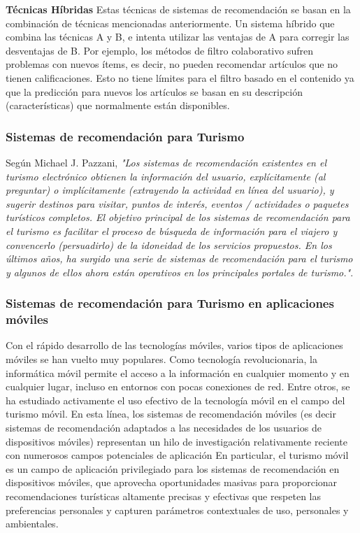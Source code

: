 \documentclass[12pt,letterpaper,openany]{book}
\begin{document}
\vspace{5mm}\newline
\textbf{Técnicas Híbridas}\newline
Estas técnicas de sistemas de recomendación se basan en la combinación de técnicas mencionadas anteriormente. Un sistema híbrido que combina las técnicas A y B, e intenta utilizar las ventajas de A para corregir las desventajas de B. Por ejemplo, los métodos de filtro colaborativo sufren problemas con nuevos ítems, es decir, no pueden recomendar artículos que no tienen calificaciones. Esto no tiene límites para el filtro basado en el contenido ya que la predicción para nuevos los artículos se basan en su descripción (características) que normalmente están disponibles\cite{13}. 

\subsubsection{Sistemas de recomendación para Turismo}
Según Michael J. Pazzani, \textit{"Los sistemas de recomendación existentes en el turismo electrónico obtienen la información del usuario, explícitamente (al preguntar) o implícitamente (extrayendo la actividad en línea del usuario), y sugerir destinos para visitar, puntos de interés, eventos / actividades o paquetes turísticos completos. El objetivo principal de los sistemas de recomendación para el turismo es facilitar el proceso de búsqueda de información para el viajero y convencerlo (persuadirlo) de la idoneidad de los servicios propuestos. En los últimos años, ha surgido una serie de sistemas de recomendación para el turismo y algunos de ellos ahora están operativos en los principales portales de turismo."}\cite{16}. 

\subsubsection{Sistemas de recomendación para Turismo en aplicaciones móviles}
Con el rápido desarrollo de las tecnologías móviles, varios tipos de aplicaciones móviles se han vuelto muy populares. Como tecnología revolucionaria, la informática móvil permite el acceso a la información en cualquier momento y en cualquier lugar, incluso en entornos con pocas conexiones de red. Entre otros, se ha estudiado activamente el uso efectivo de la tecnología móvil en el campo del turismo móvil. En esta línea, los sistemas de recomendación móviles (es decir sistemas de recomendación adaptados a las necesidades de los usuarios de dispositivos móviles) representan un hilo de investigación relativamente reciente con numerosos campos potenciales de aplicación  En particular, el turismo móvil es un campo de aplicación privilegiado para los sistemas de recomendación en dispositivos móviles, que aprovecha oportunidades masivas para proporcionar recomendaciones turísticas altamente precisas y efectivas que respeten las preferencias personales y capturen parámetros contextuales de uso, personales y ambientales\cite{16}. 
\end{document}
